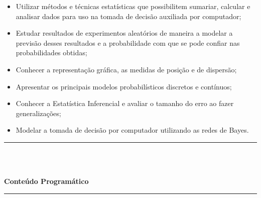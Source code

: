 \begin{itemize}
\item Utilizar métodos e técnicas estatísticas que possibilitem sumariar, calcular e analisar dados para uso na tomada de decisão auxiliada por computador;
\item Estudar resultados de experimentos aleatórios de maneira a modelar a previsão desses resultados e a probabilidade com que se pode confiar nas probabilidades obtidas;
\item Conhecer a representação gráfica, as medidas de posição e de dispersão;
\item Apresentar os principais modelos probabilísticos discretos e contínuos;
\item Conhecer a Estatística Inferencial e avaliar o tamanho do erro ao fazer generalizações;
\item Modelar a tomada de decisão por computador utilizando as redes de Bayes.
\end{itemize} 
\noindent\rule{16.5cm}{0.4pt}\\
\\
\vspace{-12mm}
\begin{center}\textbf{Conteúdo Programático}\end{center}
\vspace{-5mm}
\noindent\rule{16.5cm}{0.4pt}
\\
